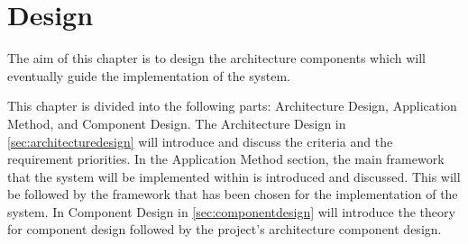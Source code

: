 \chapter{Design}\label{design}
The aim of this chapter is to design the architecture components which will eventually guide the implementation of the system.

This chapter is divided into the following parts: Architecture Design, Application Method, and Component Design.
The Architecture Design in \cref{sec:architecturedesign} will introduce and discuss the criteria and the requirement priorities.
In the Application Method section, the main framework that the system will be implemented within is introduced and discussed.
This will be followed by the framework that has been chosen for the implementation of the system.
In Component Design in \cref{sec:componentdesign} will introduce the theory for component design followed by the project's architecture component design.




